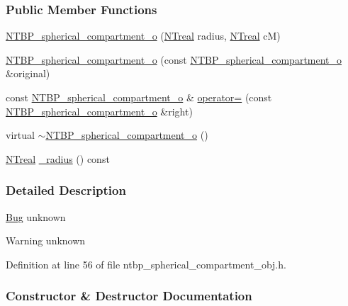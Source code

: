 \subsubsection*{Public Member Functions}
\begin{DoxyCompactItemize}
\item 
\hyperlink{class_n_t_b_p__spherical__compartment__o_a0e3253d409c6e211aa7bbf4fa71aa320}{NTBP\_\-spherical\_\-compartment\_\-o} (\hyperlink{nt__types_8h_a814a97893e9deb1eedcc7604529ba80d}{NTreal} radius, \hyperlink{nt__types_8h_a814a97893e9deb1eedcc7604529ba80d}{NTreal} cM)
\item 
\hyperlink{class_n_t_b_p__spherical__compartment__o_a23590413ac2a48fb09f4227b6bbfa9cd}{NTBP\_\-spherical\_\-compartment\_\-o} (const \hyperlink{class_n_t_b_p__spherical__compartment__o}{NTBP\_\-spherical\_\-compartment\_\-o} \&original)
\item 
const \hyperlink{class_n_t_b_p__spherical__compartment__o}{NTBP\_\-spherical\_\-compartment\_\-o} \& \hyperlink{class_n_t_b_p__spherical__compartment__o_af311022da06873c3565fc2e2cb436dd9}{operator=} (const \hyperlink{class_n_t_b_p__spherical__compartment__o}{NTBP\_\-spherical\_\-compartment\_\-o} \&right)
\item 
virtual \hyperlink{class_n_t_b_p__spherical__compartment__o_ac6ff85628424c9ae7548765a3101dc2b}{$\sim$NTBP\_\-spherical\_\-compartment\_\-o} ()
\item 
\hyperlink{nt__types_8h_a814a97893e9deb1eedcc7604529ba80d}{NTreal} \hyperlink{class_n_t_b_p__spherical__compartment__o_ad096d48bd81c544def6315bb204412aa}{\_\-radius} () const 
\end{DoxyCompactItemize}


\subsubsection{Detailed Description}
\begin{Desc}
\item[\hyperlink{bug__bug000082}{Bug}]unknown \end{Desc}
\begin{DoxyWarning}{Warning}
unknown 
\end{DoxyWarning}


Definition at line 56 of file ntbp\_\-spherical\_\-compartment\_\-obj.h.



\subsubsection{Constructor \& Destructor Documentation}
